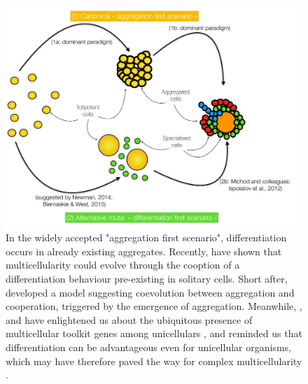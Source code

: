\begin{figure}[h!]
    \centering
    \includegraphics[scale=0.425,trim=0cm 0cm 1cm 0cm,clip]{pics/Cell-Diversity/Schema_route_to_multi.pdf}
    \caption{In the widely accepted "aggregation first scenario", differentiation occurs in already existing aggregates. Recently, \citet{Ispolatov12} have shown that multicellularity could evolve through the cooption of a differentiation behaviour pre-existing in solitary cells. Short after, \citet{BiernaskieWest15} developed a model suggesting coevolution between aggregation and cooperation, triggered by the emergence of aggregation. Meanwhile, \citet{Rokas08}, \citet{Ruiz-Trillo08} and \citet{Tikhonenkov20} have enlightened us about the ubiquitous presence of multicellular toolkit genes among unicellulars \citep{Sebe-Pedros16,Sebe-Pedros17,Ferrer-Bonet17}, and \citet{Niklas14} reminded us that differentiation can be advantageous even for unicellular organisms, which may have therefore paved the way for complex multicellularity \citep{Brunet17}.}
    \label{fig:EvoRoutes-Multi}
    \vspace{-0.5cm}
\end{figure}


